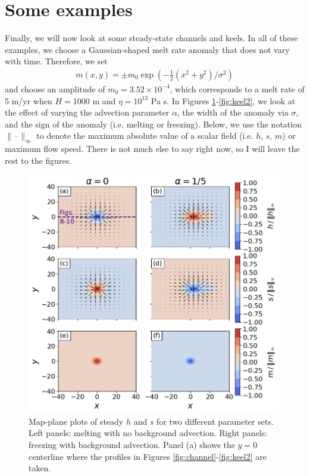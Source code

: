 \documentclass[paper=a4, fontsize=11pt]{article} %
\begin{document}
\section{Some examples}
Finally, we will now look at some steady-state channels and keels. In all of these examples,
we choose a Gaussian-shaped melt rate anomaly that does not vary with time.
Therefore, we set
\begin{align}
m(x,y) = \pm m_0\exp\left(-\frac{1}{2}(x^2+y^2)/\sigma^2\right)
\end{align}
and choose an amplitude of $m_0=3.52\times 10^{-4}$, which corresponds to a melt
rate of 5 m/yr when $H=1000$ m and $\eta = 10^{13}$ Pa s.
In Figures \ref{fig:map}-\ref{fig:keel2}, we look at the effect of
varying the advection parameter $\alpha$, the width of the anomaly via $\sigma$,
and the sign of the anomaly (i.e. melting or freezing). Below, we use the notation $\|\cdot\|_\infty$
to denote the maximum absolute value of a scalar field (i.e. $h$, $s$, $m$) or
maximum flow speed. There is not much else to say right now, so I will
leave the rest to the figures.

\begin{figure}
  \centering
\includegraphics[width=0.99\textwidth]{figs/fig7.png}
\caption{Map-plane plots of steady $h$ and $s$ for two different parameter sets.
Left panels: melting with no background advection. Right panels: freezing with
background advection. Panel (a) shows the $y=0$ centerline where the profiles in Figures \ref{fig:channel}-\ref{fig:keel2} are taken.}
\label{fig:map}
\end{figure}
\end{document}
